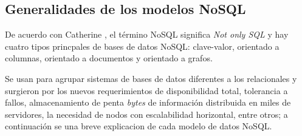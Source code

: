 \subsection{Generalidades de los modelos NoSQL}
De acuerdo con Catherine \cite{cristina_marta_bender_topicos_nodate}, el término NoSQL significa \textit{Not only SQL} y hay cuatro tipos princpales de bases de datos NoSQL: clave-valor, orientado a columnas, orientado a documentos y orientado a grafos. 


Se usan para agrupar sistemas de bases de datos diferentes a los relacionales y surgieron por los nuevos requerimientos de disponibilidad total, tolerancia a fallos, almacenamiento de penta \textit{bytes} de información distribuida en miles de servidores, la necesidad de nodos con escalabilidad horizontal, entre otros; a continuación se una breve explicacion de cada modelo de datos NoSQL.